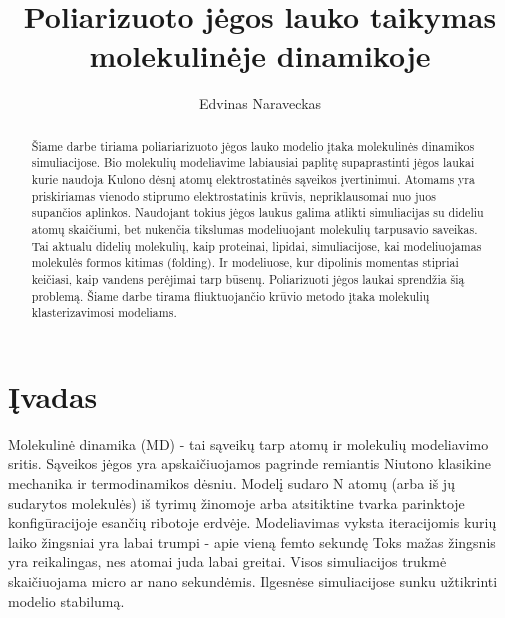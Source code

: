 \documentclass[runningheads]{llncs}
\begin{document}
%
\title{Poliarizuoto jėgos lauko taikymas molekulinėje dinamikoje}
%
%
\author{Edvinas Naraveckas}
%
%
%
\maketitle              %
%
\begin{abstract}
Šiame darbe tiriama poliariarizuoto jėgos lauko modelio įtaka molekulinės dinamikos simuliacijose.
Bio molekulių modeliavime labiausiai paplitę supaprastinti jėgos laukai kurie naudoja Kulono dėsnį atomų elektrostatinės sąveikos įvertinimui.
Atomams yra priskiriamas vienodo stiprumo elektrostatinis krūvis, nepriklausomai nuo juos supančios aplinkos.
Naudojant tokius jėgos laukus galima atlikti simuliacijas su dideliu atomų skaičiumi, bet nukenčia tikslumas modeliuojant molekulių tarpusavio saveikas.
Tai aktualu didelių molekulių, kaip proteinai, lipidai, simuliacijose, kai modeliuojamas molekulės formos kitimas (folding).
Ir modeliuose, kur dipolinis momentas stipriai keičiasi, kaip vandens perėjimai tarp būsenų.
Poliarizuoti jėgos laukai sprendžia šią problemą.
Šiame darbe tirama fliuktuojančio krūvio metodo įtaka molekulių klasterizavimosi modeliams.

\end{abstract}
%
%
%
\section{Įvadas}

Molekulinė dinamika (MD) - tai sąveikų tarp atomų ir molekulių modeliavimo sritis.
Sąveikos jėgos yra apskaičiuojamos pagrinde remiantis Niutono klasikine mechanika ir termodinamikos dėsniu.
Modelį sudaro N atomų (arba iš jų sudarytos molekulės) iš tyrimų žinomoje arba atsitiktine tvarka parinktoje konfigūracijoje esančių ribotoje erdvėje.
Modeliavimas vyksta iteracijomis kurių laiko žingsniai yra labai trumpi - apie vieną femto sekundę
Toks mažas žingsnis yra reikalingas, nes atomai juda labai greitai.
Visos simuliacijos trukmė skaičiuojama micro ar nano sekundėmis.
Ilgesnėse simuliacijose sunku užtikrinti modelio stabilumą.
\end{document}
